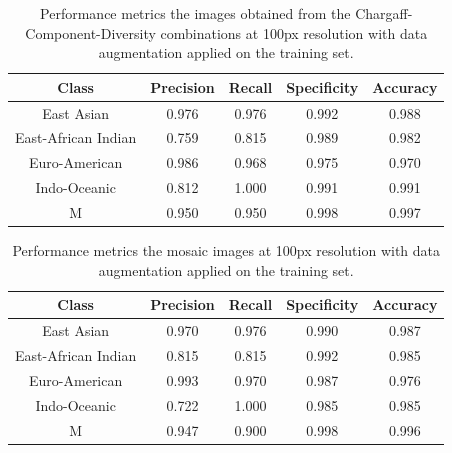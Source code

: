 \begin{table}[H]
	\centering
	\begin{tabular}{|c|c|c|c|c|}
		\hline
		\textbf{Class}      & \textbf{Precision} & \textbf{Recall} & \textbf{Specificity} & \textbf{Accuracy} \\
		\hline
		East Asian          & 0.976              & 0.976           & 0.992                & 0.988             \\
		East-African Indian & 0.759              & 0.815           & 0.989                & 0.982             \\
		Euro-American       & 0.986              & 0.968           & 0.975                & 0.970             \\
		Indo-Oceanic        & 0.812              & 1.000           & 0.991                & 0.991             \\
		M                   & 0.950              & 0.950           & 0.998                & 0.997             \\
		\hline
	\end{tabular}
	\caption{Performance metrics the images obtained from the Chargaff-Component-Diversity
		combinations at 100px resolution with data augmentation applied on the training set.}
	\label{tab:augmentation_performance_metrics}
\end{table}

\begin{table}[H]
	\centering
	\begin{tabular}{|c|c|c|c|c|}
		\hline
		\textbf{Class}      & \textbf{Precision} & \textbf{Recall} & \textbf{Specificity} & \textbf{Accuracy} \\
		\hline
		East Asian          & 0.970              & 0.976           & 0.990                & 0.987             \\
		East-African Indian & 0.815              & 0.815           & 0.992                & 0.985             \\
		Euro-American       & 0.993              & 0.970           & 0.987                & 0.976             \\
		Indo-Oceanic        & 0.722              & 1.000           & 0.985                & 0.985             \\
		M                   & 0.947              & 0.900           & 0.998                & 0.996             \\
		\hline
	\end{tabular}
	\caption{Performance metrics the mosaic images at 100px resolution with data augmentation applied on the training set.}
	\label{tab:augmentation_performance_metrics_mosaic}
\end{table}

